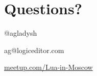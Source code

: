 \documentclass[aspectratio=169,handout,bigger]{beamer}
\begin{document}

\section*{Questions?}

\begin{frame}

\begin{center}
\Huge{@agladysh}
\end{center}

\begin{center}
\Large{ag@logiceditor.com}
\end{center}

\begin{center}
\href{http://meetup.com/Lua-in-Moscow}{meetup.com/Lua-in-Moscow}
\end{center}

\end{frame}

\end{document}
